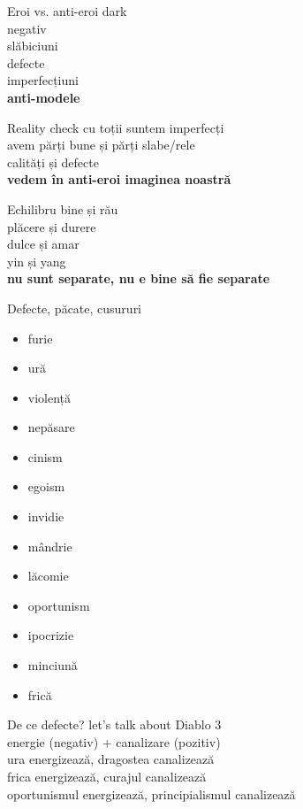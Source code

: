 \documentclass{simple}
\begin{document}
\begin{frame}{Eroi vs. anti-eroi}
  \centering
  \Large
  \pause dark \\
  \pause negativ \\
  \pause slăbiciuni \\
  \pause defecte \\
  \pause imperfecțiuni \\
  \pause \textbf{anti-modele}
\end{frame}

\begin{frame}{Reality check}
  \centering
  \Large
  \pause cu toții suntem imperfecți \\
  \pause avem părți bune și părți slabe/rele \\
  \pause calități și defecte \\
  \pause \textbf{vedem în anti-eroi imaginea noastră}
\end{frame}

\begin{frame}{Echilibru}
  \centering
  \Large
  \pause bine și rău \\
  \pause plăcere și durere \\
  \pause dulce și amar \\
  \pause yin și yang \\
  \pause \textbf{nu sunt separate, nu e bine să fie separate}
\end{frame}

\begin{frame}{Defecte, păcate, cusururi}
  \begin{itemize}
    \item furie
    \item ură
    \item violență
    \item nepăsare
    \item cinism
    \item egoism
    \item invidie
    \item mândrie
    \item lăcomie
    \item oportunism
    \item ipocrizie
    \item minciună
    \item frică
  \end{itemize}
\end{frame}

\begin{frame}{De ce defecte?}
  \centering
  \Large
  \pause let's talk about Diablo 3 \\
  \pause energie (negativ) + canalizare (pozitiv) \\
  \pause ura energizează, dragostea canalizează \\
  \pause frica energizează, curajul canalizează \\
  \pause oportunismul energizează, principialismul canalizează
\end{frame}
\end{document}
